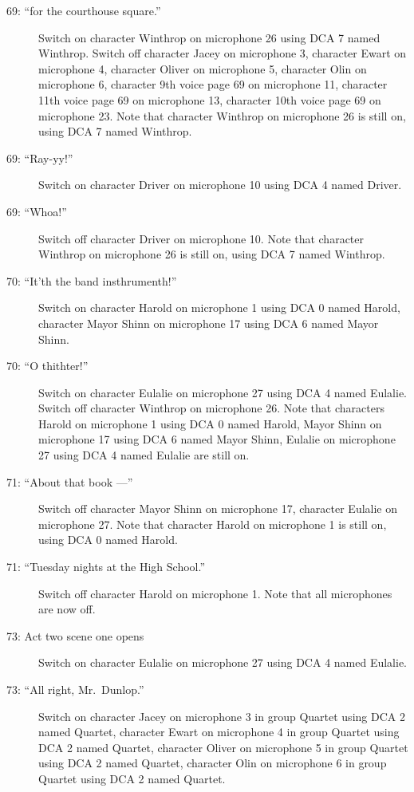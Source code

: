 \begin{description}
\item[69: ``for the courthouse square.'']
Switch on character Winthrop on microphone 26 using DCA 7 named Winthrop. Switch off character Jacey on microphone 3, character Ewart on microphone 4, character Oliver on microphone 5, character Olin on microphone 6, character 9th voice page 69 on microphone 11, character 11th voice page 69 on microphone 13, character 10th voice page 69 on microphone 23. Note that character Winthrop on microphone 26 is still on, using DCA 7 named Winthrop.

\item[69: ``Ray-yy!'']
Switch on character Driver on microphone 10 using DCA 4 named Driver. 

\item[69: ``Whoa!'']
Switch off character Driver on microphone 10. Note that character Winthrop on microphone 26 is still on, using DCA 7 named Winthrop.

\item[70: ``It'th the band insthrumenth!'']
Switch on character Harold on microphone 1 using DCA 0 named Harold, character Mayor Shinn on microphone 17 using DCA 6 named Mayor Shinn. 

\item[70: ``O thithter!'']
Switch on character Eulalie on microphone 27 using DCA 4 named Eulalie. Switch off character Winthrop on microphone 26. Note that characters Harold on microphone 1 using DCA 0 named Harold, Mayor Shinn on microphone 17 using DCA 6 named Mayor Shinn, Eulalie on microphone 27 using DCA 4 named Eulalie are still on.  

\item[71: ``About that book ---'']
Switch off character Mayor Shinn on microphone 17, character Eulalie on microphone 27. Note that character Harold on microphone 1 is still on, using DCA 0 named Harold.

\item[71: ``Tuesday nights at the High School.'']
Switch off character Harold on microphone 1. Note that all microphones are now off.

\item[73: Act two scene one opens]
Switch on character Eulalie on microphone 27 using DCA 4 named Eulalie. 

\item[73: ``All right, Mr.~Dunlop.'']
Switch on character Jacey on microphone 3 in group Quartet using DCA 2 named Quartet, character Ewart on microphone 4 in group Quartet using DCA 2 named Quartet, character Oliver on microphone 5 in group Quartet using DCA 2 named Quartet, character Olin on microphone 6 in group Quartet using DCA 2 named Quartet. 


\end{description}
